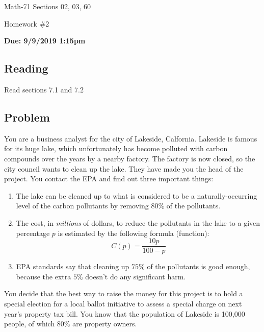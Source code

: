 \documentclass[letterpaper,12pt,fleqn]{article}
\begin{document}
\begin{center}
  \large
  Math-71 Sections 02, 03, 60

  \Large
  Homework \#2

  \large
  \textbf{Due: 9/9/2019 1:15pm}
\end{center}

\subsection*{Reading}

Read sections 7.1 and 7.2

\subsection*{Problem}

You are a business analyst for the city of Lakeside, Calfornia.  Lakeside is famous for its huge lake, which
unfortunately has become polluted with carbon compounds over the years by a nearby factory.  The factory is now
closed, so the city council wants to clean up the lake.  They have made you the head of the project.  You contact
the EPA and find out three important things:
\begin{enumerate}
\item The lake can be cleaned up to what is considered to be a naturally-occurring level of the carbon pollutants
  by removing \(80\%\) of the pollutants.
\item The cost, in \emph{millions} of dollars, to reduce the pollutants in the lake to a given percentage \(p\) is
  estimated by the following formula (function):
  \[C(p)=\frac{10p}{100-p}\]
\item EPA standards say that cleaning up \(75\%\) of the pollutants is good enough, because the extra \(5\%\)
  doesn't do any significant harm.
\end{enumerate}
You decide that the best way to raise the money for this project is to hold a special election for a local ballot
initiative to assess a special charge on next year's property tax bill.  You know that the population of Lakeside
is 100,000 people, of which \(80\%\) are property owners.
\end{document}
